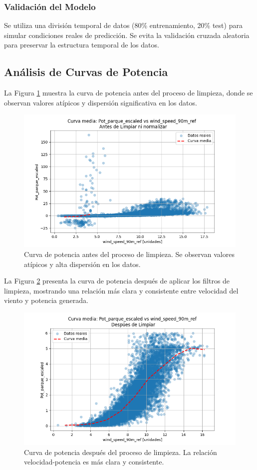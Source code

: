 \documentclass[conference]{IEEEtran}
\begin{document}
	\subsubsection{Validación del Modelo}
	Se utiliza una división temporal de datos (80\% entrenamiento, 20\% test) para simular condiciones reales de predicción. Se evita la validación cruzada aleatoria para preservar la estructura temporal de los datos.
	
	\subsection{Análisis de Curvas de Potencia}
	La Figura \ref{fig:curva_antes_limpieza} muestra la curva de potencia antes del proceso de limpieza, donde se observan valores atípicos y dispersión significativa en los datos.
	
	\begin{figure}[htbp]
		\centering
		\includegraphics[width=0.8\linewidth]{images/Figure_1.png}
		\caption{Curva de potencia antes del proceso de limpieza. Se observan valores atípicos y alta dispersión en los datos.}
		\label{fig:curva_antes_limpieza}
	\end{figure}
	
	La Figura \ref{fig:curva_despues_limpieza} presenta la curva de potencia después de aplicar los filtros de limpieza, mostrando una relación más clara y consistente entre velocidad del viento y potencia generada.
	
	\begin{figure}[htbp]
		\centering
		\includegraphics[width=0.8\linewidth]{images/Figure_2.png}
		\caption{Curva de potencia después del proceso de limpieza. La relación velocidad-potencia es más clara y consistente.}
		\label{fig:curva_despues_limpieza}
	\end{figure}
	
\end{document}

